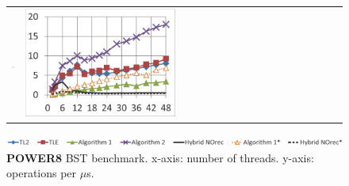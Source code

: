 \begin{figure}
\begin{minipage}{1\linewidth}
\begin{tabular}{m{0.04\linewidth}m{0.48\linewidth}m{0.48\linewidth}}
        \vspace{-8mm}\includegraphics[width=\linewidth]{figures/graphs/power8/20i20d10000k-nrq0.png} &
        \vspace{-8mm}\includegraphics[width=\linewidth]{figures/graphs/power8/20i20d10000k-nrq1.png}
        \\
    \end{tabular}
\end{minipage}
    \vspace{-2mm}
	\includegraphics[width=\linewidth]{figures/graphs/power8/dsbench3_legend_power.png}
    \vspace{-2mm}
\caption{\textbf{POWER8} BST benchmark. x-axis: number of threads. y-axis: operations per $\mu$s.}
\label{fig-exp-power8}
\end{figure}

